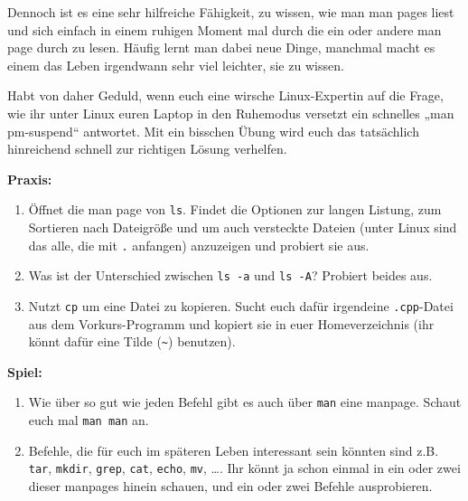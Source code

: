Dennoch ist es eine sehr hilfreiche Fähigkeit, zu wissen, wie man man pages
liest und sich einfach in einem ruhigen Moment mal durch die ein oder andere
man page durch zu lesen. Häufig lernt man dabei neue Dinge, manchmal macht es
einem das Leben irgendwann sehr viel leichter, sie zu wissen.

Habt von daher Geduld, wenn euch eine wirsche Linux-Expertin auf die Frage, wie
ihr unter Linux euren Laptop in den Ruhemodus versetzt ein schnelles „man
pm-suspend“ antwortet. Mit ein bisschen Übung wird euch das tatsächlich
hinreichend schnell zur richtigen Lösung verhelfen.

\textbf{Praxis:}
\begin{enumerate}[resume]
    \item Öffnet die man page von \texttt{ls}. Findet die Optionen zur langen
        Listung, zum Sortieren nach Dateigröße und um auch versteckte Dateien
        (unter Linux sind das alle, die mit \texttt{.} anfangen) anzuzeigen und
        probiert sie aus.
    \item Was ist der Unterschied zwischen \texttt{ls -a} und \texttt{ls -A}?
        Probiert beides aus.
    \item Nutzt \texttt{cp} um eine Datei zu kopieren. Sucht euch dafür
        irgendeine \texttt{.cpp}-Datei aus dem Vorkurs-Programm und kopiert sie
        in euer Homeverzeichnis (ihr könnt dafür eine Tilde (\texttt{\~})
        benutzen).
\end{enumerate}

\textbf{Spiel:}
\begin{enumerate}
    \item Wie über so gut wie jeden Befehl gibt es auch über \texttt{man} eine
        manpage. Schaut euch mal \texttt{man man} an.
    \item Befehle, die für euch im späteren Leben interessant sein könnten sind
        z.B. \texttt{tar}, \texttt{mkdir}, \texttt{grep}, \texttt{cat},
        \texttt{echo}, \texttt{mv}, \dots. Ihr könnt ja schon einmal in ein
        oder zwei dieser manpages hinein schauen, und ein oder zwei Befehle
        ausprobieren.
\end{enumerate}
